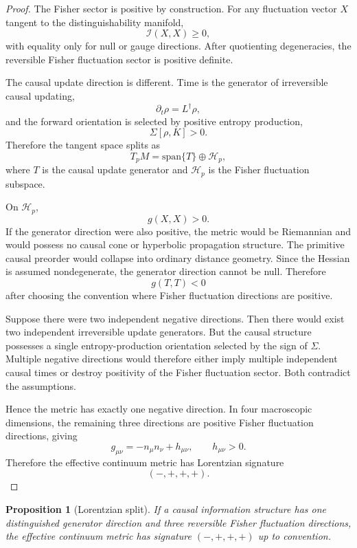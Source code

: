 \documentclass[11pt]{article}
\newtheorem{proposition}[definition]{Proposition}
\begin{document}
\begin{proof}
The Fisher sector is positive by construction. For any fluctuation vector $X$ tangent to the distinguishability manifold,
\[
\mathcal I(X,X)\ge0,
\]
with equality only for null or gauge directions. After quotienting degeneracies, the reversible Fisher fluctuation sector is positive definite.

The causal update direction is different. Time is the generator of irreversible causal updating,
\[
\partial_t\rho=L^\dagger\rho,
\]
and the forward orientation is selected by positive entropy production,
\[
\Sigma[\rho,K]>0.
\]
Therefore the tangent space splits as
\[
T_pM=\mathrm{span}\{T\}\oplus\mathcal H_p,
\]
where $T$ is the causal update generator and $\mathcal H_p$ is the Fisher fluctuation subspace.

On $\mathcal H_p$,
\[
g(X,X)>0.
\]
If the generator direction were also positive, the metric would be Riemannian and would possess no causal cone or hyperbolic propagation structure. The primitive causal preorder would collapse into ordinary distance geometry. Since the Hessian is assumed nondegenerate, the generator direction cannot be null. Therefore
\[
g(T,T)<0
\]
after choosing the convention where Fisher fluctuation directions are positive.

Suppose there were two independent negative directions. Then there would exist two independent irreversible update generators. But the causal structure possesses a single entropy-production orientation selected by the sign of $\Sigma$. Multiple negative directions would therefore either imply multiple independent causal times or destroy positivity of the Fisher fluctuation sector. Both contradict the assumptions.

Hence the metric has exactly one negative direction. In four macroscopic dimensions, the remaining three directions are positive Fisher fluctuation directions, giving
\[
g_{\mu\nu}=-n_\mu n_\nu+h_{\mu\nu},
\qquad
h_{\mu\nu}>0.
\]
Therefore the effective continuum metric has Lorentzian signature
\[
(-,+,+,+).
\]
\end{proof}


\begin{proposition}[Lorentzian split]
If a causal information structure has one distinguished generator direction and three reversible Fisher fluctuation directions, the effective continuum metric has signature $(-,+,+,+)$ up to convention.
\end{proposition}
\end{document}
